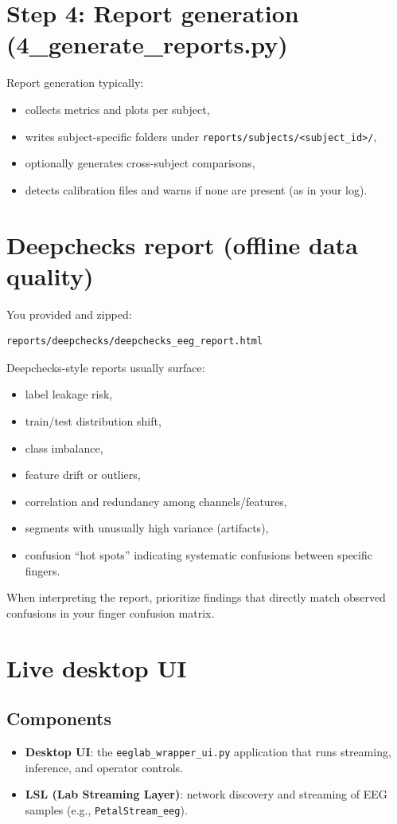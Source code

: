 \documentclass[11pt]{article}
\begin{document}
\section{Step 4: Report generation (4\_generate\_reports.py)}
Report generation typically:
\begin{itemize}[leftmargin=*]
\item collects metrics and plots per subject,
\item writes subject-specific folders under \texttt{reports/subjects/<subject\_id>/},
\item optionally generates cross-subject comparisons,
\item detects calibration files and warns if none are present (as in your log).
\end{itemize}

\section{Deepchecks report (offline data quality)}
You provided and zipped:
\begin{lstlisting}
reports/deepchecks/deepchecks_eeg_report.html
\end{lstlisting}
Deepchecks-style reports usually surface:
\begin{itemize}[leftmargin=*]
\item label leakage risk,
\item train/test distribution shift,
\item class imbalance,
\item feature drift or outliers,
\item correlation and redundancy among channels/features,
\item segments with unusually high variance (artifacts),
\item confusion ``hot spots'' indicating systematic confusions between specific fingers.
\end{itemize}
When interpreting the report, prioritize findings that directly match observed confusions in your finger confusion matrix.

\section{Live desktop UI}
\subsection{Components}
\begin{itemize}[leftmargin=*]
\item \textbf{Desktop UI}: the \texttt{eeglab\_wrapper\_ui.py} application that runs streaming, inference, and operator controls.
\item \textbf{LSL (Lab Streaming Layer)}: network discovery and streaming of EEG samples (e.g., \texttt{PetalStream\_eeg}).
\end{itemize}
\end{document}
